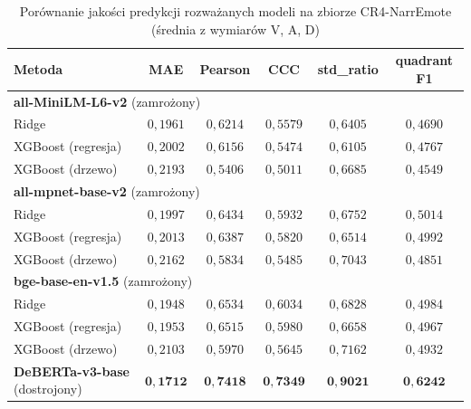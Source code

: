 \begin{table}[htbp]
    \centering
    \small
    \caption{Porównanie jakości predykcji rozważanych modeli na zbiorze CR4-NarrEmote (średnia z wymiarów V, A, D)}
    \begin{tabular}{l c c c c c}
        \toprule
        \textbf{Metoda} & \textbf{MAE} & \textbf{Pearson} & \textbf{CCC} & \textbf{std\_ratio} & \textbf{quadrant F1} \\
        \midrule
        \multicolumn{6}{l}{\textbf{all-MiniLM-L6-v2} (zamrożony)} \\
        \hspace{1em}Ridge              & $0{,}1961$ & $0{,}6214$ & $0{,}5579$ & $0{,}6405$ & $0{,}4690$ \\
        \hspace{1em}XGBoost (regresja) & $0{,}2002$ & $0{,}6156$ & $0{,}5474$ & $0{,}6105$ & $0{,}4767$ \\
        \hspace{1em}XGBoost (drzewo)   & $0{,}2193$ & $0{,}5406$ & $0{,}5011$ & $0{,}6685$ & $0{,}4549$ \\
        \midrule
        \multicolumn{6}{l}{\textbf{all-mpnet-base-v2} (zamrożony)} \\
        \hspace{1em}Ridge              & $0{,}1997$ & $0{,}6434$ & $0{,}5932$ & $0{,}6752$ & $0{,}5014$ \\
        \hspace{1em}XGBoost (regresja) & $0{,}2013$ & $0{,}6387$ & $0{,}5820$ & $0{,}6514$ & $0{,}4992$ \\
        \hspace{1em}XGBoost (drzewo)   & $0{,}2162$ & $0{,}5834$ & $0{,}5485$ & $0{,}7043$ & $0{,}4851$ \\
        \midrule
        \multicolumn{6}{l}{\textbf{bge-base-en-v1.5} (zamrożony)} \\
        \hspace{1em}Ridge              & $0{,}1948$ & $0{,}6534$ & $0{,}6034$ & $0{,}6828$ & $0{,}4984$ \\
        \hspace{1em}XGBoost (regresja) & $0{,}1953$ & $0{,}6515$ & $0{,}5980$ & $0{,}6658$ & $0{,}4967$ \\
        \hspace{1em}XGBoost (drzewo)   & $0{,}2103$ & $0{,}5970$ & $0{,}5645$ & $0{,}7162$ & $0{,}4932$ \\
        \midrule
        \textbf{DeBERTa-v3-base} (dostrojony) & $\mathbf{0{,}1712}$ & $\mathbf{0{,}7418}$ & $\mathbf{0{,}7349}$ & $\mathbf{0{,}9021}$ & $\mathbf{0{,}6242}$ \\
        \bottomrule
    \end{tabular}
    \label{tab:embedding_quality_comp_deberta}
\end{table}

